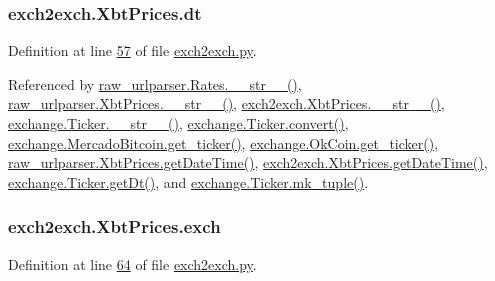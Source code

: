 \subsubsection[{\texorpdfstring{dt}{dt}}]{\setlength{\rightskip}{0pt plus 5cm}exch2exch.\+Xbt\+Prices.\+dt}\hypertarget{classexch2exch_1_1_xbt_prices_af9f916c683c48631c97f1c5d91447751}{}\label{classexch2exch_1_1_xbt_prices_af9f916c683c48631c97f1c5d91447751}


Definition at line \hyperlink{exch2exch_8py_source_l00057}{57} of file \hyperlink{exch2exch_8py_source}{exch2exch.\+py}.



Referenced by \hyperlink{raw__urlparser_8py_source_l00038}{raw\+\_\+urlparser.\+Rates.\+\_\+\+\_\+str\+\_\+\+\_\+()}, \hyperlink{raw__urlparser_8py_source_l00074}{raw\+\_\+urlparser.\+Xbt\+Prices.\+\_\+\+\_\+str\+\_\+\+\_\+()}, \hyperlink{exch2exch_8py_source_l00091}{exch2exch.\+Xbt\+Prices.\+\_\+\+\_\+str\+\_\+\+\_\+()}, \hyperlink{exchange_8py_source_l00099}{exchange.\+Ticker.\+\_\+\+\_\+str\+\_\+\+\_\+()}, \hyperlink{exchange_8py_source_l00055}{exchange.\+Ticker.\+convert()}, \hyperlink{exchange_8py_source_l00306}{exchange.\+Mercado\+Bitcoin.\+get\+\_\+ticker()}, \hyperlink{exchange_8py_source_l00371}{exchange.\+Ok\+Coin.\+get\+\_\+ticker()}, \hyperlink{raw__urlparser_8py_source_l00059}{raw\+\_\+urlparser.\+Xbt\+Prices.\+get\+Date\+Time()}, \hyperlink{exch2exch_8py_source_l00067}{exch2exch.\+Xbt\+Prices.\+get\+Date\+Time()}, \hyperlink{exchange_8py_source_l00081}{exchange.\+Ticker.\+get\+Dt()}, and \hyperlink{exchange_8py_source_l00084}{exchange.\+Ticker.\+mk\+\_\+tuple()}.

\subsubsection[{\texorpdfstring{exch}{exch}}]{\setlength{\rightskip}{0pt plus 5cm}exch2exch.\+Xbt\+Prices.\+exch}\hypertarget{classexch2exch_1_1_xbt_prices_a72caf3a29017a1ceaf4367240a46b360}{}\label{classexch2exch_1_1_xbt_prices_a72caf3a29017a1ceaf4367240a46b360}


Definition at line \hyperlink{exch2exch_8py_source_l00064}{64} of file \hyperlink{exch2exch_8py_source}{exch2exch.\+py}.



